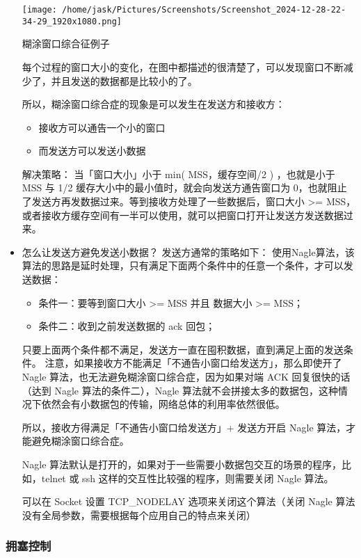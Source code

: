 \documentclass[11pt]{article}
\begin{document}
\begin{itemize}
\begin{center}
\texttt{[image: /home/jask/Pictures/Screenshots/Screenshot\_2024-12-28-22-34-29\_1920x1080.png]}
\end{center}
糊涂窗口综合征例子

每个过程的窗口大小的变化，在图中都描述的很清楚了，可以发现窗口不断减少了，并且发送的数据都是比较小的了。

所以，糊涂窗口综合症的现象是可以发生在发送方和接收方：
\begin{itemize}
\item 接收方可以通告一个小的窗口

\item 而发送方可以发送小数据
\end{itemize}

解决策略：
当「窗口大小」小于 min( MSS，缓存空间/2 ) ，也就是小于 MSS 与 1/2 缓存大小中的最小值时，就会向发送方通告窗口为 0，也就阻止了发送方再发数据过来。等到接收方处理了一些数据后，窗口大小 >= MSS，或者接收方缓存空间有一半可以使用，就可以把窗口打开让发送方发送数据过来。

\item 怎么让发送方避免发送小数据？
发送方通常的策略如下：
使用Nagle算法，该算法的思路是延时处理，只有满足下面两个条件中的任意一个条件，才可以发送数据：
\begin{itemize}
\item 条件一：要等到窗口大小 >= MSS 并且 数据大小 >= MSS；

\item 条件二：收到之前发送数据的 ack 回包；
\end{itemize}

只要上面两个条件都不满足，发送方一直在囤积数据，直到满足上面的发送条件。
注意，如果接收方不能满足「不通告小窗口给发送方」，那么即使开了 Nagle 算法，也无法避免糊涂窗口综合症，因为如果对端 ACK 回复很快的话（达到 Nagle 算法的条件二），Nagle 算法就不会拼接太多的数据包，这种情况下依然会有小数据包的传输，网络总体的利用率依然很低。

所以，接收方得满足「不通告小窗口给发送方」+ 发送方开启 Nagle 算法，才能避免糊涂窗口综合症。

Nagle 算法默认是打开的，如果对于一些需要小数据包交互的场景的程序，比如，telnet 或 ssh 这样的交互性比较强的程序，则需要关闭 Nagle 算法。

可以在 Socket 设置 TCP\_NODELAY 选项来关闭这个算法（关闭 Nagle 算法没有全局参数，需要根据每个应用自己的特点来关闭）
\end{itemize}
\subsubsection{拥塞控制}
\label{sec:org138fdc2}
\end{document}
